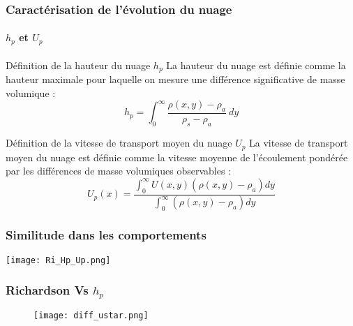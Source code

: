 \documentclass[12pt, xcolor=svgnames]{beamer}
\newcommand{\bepar}[1]{
	\left( #1 \right)  
}
\begin{document}
\begin{frame}
\frametitle{Caractérisation de l'évolution du nuage}
\framesubtitle{$h_p$ et $U_p$}

\begin{block}{Définition de la hauteur du nuage $h_p$}
La hauteur du nuage est définie comme la hauteur maximale pour laquelle on mesure une différence significative de masse volumique : \\
\begin{equation*}
h_p = \int^\infty_0 \dfrac{\rho\bepar{x,y} - \rho_a}{\rho_s - \rho_a} ~dy
\end{equation*}
\end{block}

\begin{block}{Définition de la vitesse de transport moyen du nuage $U_p$}
La vitesse de transport moyen du nuage est définie comme la vitesse moyenne de l'écoulement pondérée par les différences de masse volumiques observables :
\begin{equation*}
 U_p(x) = \frac{ \int^{\infty}_0 U(x,y)\bepar{\rho(x,y) - \rho_a} dy}{\int^{\infty}_0 \bepar{\rho(x,y) - \rho_a} dy}
\end{equation*}
\end{block}

\end{frame}

\begin{frame}
\frametitle{Similitude dans les comportements}


\begin{center}
 \texttt{[image: Ri\_Hp\_Up.png]}
\end{center}

\end{frame}

\begin{frame}
\frametitle{Richardson Vs $h_p$}
\begin{figure}[!ht]
\centering
\texttt{[image: diff\_ustar.png]}
\end{figure}

\end{frame}
\end{document}
